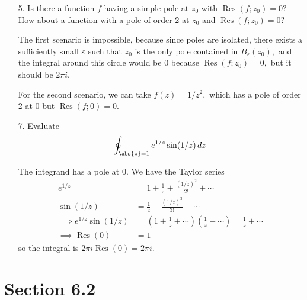 \documentclass{article}
\DeclareMathOperator{\Res}{Res}
\begin{document}
\begin{itemize}
\begin{itemize}
		\end{itemize}

	\item[5.] Is there a function $f$ having a simple pole at $z_0$ with $\Res(f; z_0)=0?$ How about a function with a pole of order 2 at $z_0$ and $\Res(f; z_0)=0?$
		\begin{answer*}
			The first scenario is impossible, because since poles are isolated, there exists a sufficiently small $\varepsilon$ such that $z_0$ is the only pole contained in $B_\varepsilon(z_0),$ and the integral around this circle would be 0 because $\Res(f; z_0)=0,$ but it should be $2\pi i.$

			For the second scenario, we can take $f(z)=1/z^2,$ which has a pole of order 2 at 0 but $\Res(f; 0)=0.$
		\end{answer*}

	\item[7.] Evaluate
		\begin{align*}
			\oint_{\abs{z}=1} e^{1/z}\sin(1/z)\, dz
		\end{align*}
		\begin{soln}
			The integrand has a pole at 0. We have the Taylor series
			\begin{align*}
				e^{1/z} &= 1 + \frac{1}{z} + \frac{(1/z)^2}{2!} + \cdots \\
				\sin(1/z) &= \frac{1}{z} - \frac{(1/z)^3}{3!} + \cdots \\
				\implies e^{1/z}\sin(1/z) &= \left( 1+\frac{1}{z} + \cdots \right)\left( \frac{1}{z} - \cdots \right) = \frac{1}{z} + \cdots \\
				\implies \Res(0) &= 1
			\end{align*}
			so the integral is $2\pi i\Res(0)=2\pi i.$
		\end{soln}
		
\end{itemize}


\section*{Section 6.2}
\end{document}
